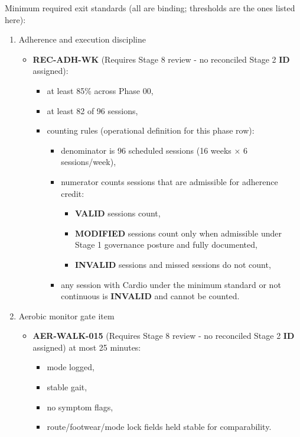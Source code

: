 \documentclass[10pt]{article}
\begin{document}
Minimum required exit standards (all are binding; thresholds are the ones listed here):

\begin{enumerate}
\item Adherence and execution discipline

\begin{itemize}
\item \textbf{REC-ADH-WK} (Requires Stage 8 review - no reconciled Stage 2 \textbf{ID} assigned):
  \begin{itemize}
  \item at least 85\% across Phase 00,
  \item at least 82 of 96 sessions,
  \item counting rules (operational definition for this phase row):
    \begin{itemize}
    \item denominator is 96 scheduled sessions (16 weeks × 6 sessions/week),
    \item numerator counts sessions that are admissible for adherence credit:
      \begin{itemize}
      \item \textbf{VALID} sessions count,
      \item \textbf{MODIFIED} sessions count only when admissible under Stage 1 governance posture and fully documented,
      \item \textbf{INVALID} sessions and missed sessions do not count,
      \end{itemize}
    \item any session with Cardio under the minimum standard or not continuous is \textbf{INVALID} and cannot be counted.
    \end{itemize}
  \end{itemize}
\end{itemize}

\item Aerobic monitor gate item

\begin{itemize}
\item \textbf{AER-WALK-015} (Requires Stage 8 review - no reconciled Stage 2 \textbf{ID} assigned) at most 25 minutes:
  \begin{itemize}
  \item mode logged,
  \item stable gait,
  \item no symptom flags,
  \item route/footwear/mode lock fields held stable for comparability.
  \end{itemize}
\end{itemize}


\end{enumerate}
\end{document}
